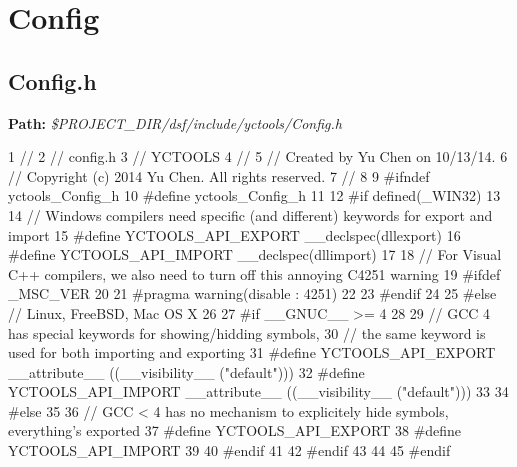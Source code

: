  \hypertarget{yctools_yctoolsConfig}{}\section{Config}\label{yctools_yctoolsConfig}
\hypertarget{yctools_yctoolsConfig_h}{}\subsection{Config.\+h}\label{yctools_yctoolsConfig_h}
{\bfseries Path\+:} {\itshape \$\+P\+R\+O\+J\+E\+C\+T\+\_\+\+D\+I\+R/dsf/include/yctools/\+Config.h} 
\begin{DoxyCodeInclude}
1 \textcolor{comment}{//}
2 \textcolor{comment}{//  config.h}
3 \textcolor{comment}{//  YCTOOLS}
4 \textcolor{comment}{//}
5 \textcolor{comment}{//  Created by Yu Chen on 10/13/14.}
6 \textcolor{comment}{//  Copyright (c) 2014 Yu Chen. All rights reserved.}
7 \textcolor{comment}{//}
8 
9 \textcolor{preprocessor}{#ifndef yctools\_Config\_h}
10 \textcolor{preprocessor}{#define yctools\_Config\_h}
11 
12 \textcolor{preprocessor}{#if defined(\_WIN32)}
13 
14 \textcolor{comment}{// Windows compilers need specific (and different) keywords for export and import}
15 \textcolor{preprocessor}{#define YCTOOLS\_API\_EXPORT \_\_declspec(dllexport)}
16 \textcolor{preprocessor}{#define YCTOOLS\_API\_IMPORT \_\_declspec(dllimport)}
17 
18 \textcolor{comment}{// For Visual C++ compilers, we also need to turn off this annoying C4251 warning}
19 \textcolor{preprocessor}{#ifdef \_MSC\_VER}
20 
21 \textcolor{preprocessor}{#pragma warning(disable : 4251)}
22 
23 \textcolor{preprocessor}{#endif}
24 
25 \textcolor{preprocessor}{#else // Linux, FreeBSD, Mac OS X}
26 
27 \textcolor{preprocessor}{#if \_\_GNUC\_\_ >= 4}
28 
29 \textcolor{comment}{// GCC 4 has special keywords for showing/hidding symbols,}
30 \textcolor{comment}{// the same keyword is used for both importing and exporting}
31 \textcolor{preprocessor}{#define YCTOOLS\_API\_EXPORT \_\_attribute\_\_ ((\_\_visibility\_\_ ("default")))}
32 \textcolor{preprocessor}{#define YCTOOLS\_API\_IMPORT \_\_attribute\_\_ ((\_\_visibility\_\_ ("default")))}
33 
34 \textcolor{preprocessor}{#else}
35 
36 \textcolor{comment}{// GCC < 4 has no mechanism to explicitely hide symbols, everything's exported}
37 \textcolor{preprocessor}{#define YCTOOLS\_API\_EXPORT}
38 \textcolor{preprocessor}{#define YCTOOLS\_API\_IMPORT}
39 
40 \textcolor{preprocessor}{#endif}
41 
42 \textcolor{preprocessor}{#endif}
43 
44 
45 \textcolor{preprocessor}{#endif}
\end{DoxyCodeInclude}
